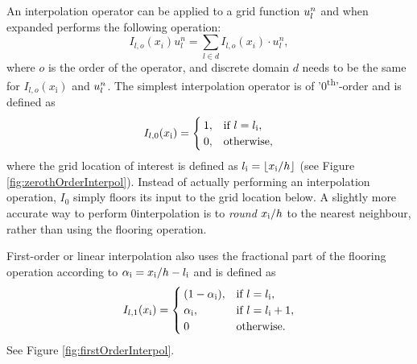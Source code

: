 An interpolation operator can be applied to a grid function $u_l^n$ and when expanded performs the following operation:
\begin{equation}
    I_{l,o}(x_i)u_l^n = \sum_{l\in d} I_{l,o}(x_i)\cdot u_l^n,
\end{equation} 
where $o$ is the order of the operator, and discrete domain $d$ needs to be the same for $I_{l,o}(x_\text{i})$ and $u_l^n$.
The simplest interpolation operator is of '0\textsuperscript{th}'-order and is defined as
\begin{equation}\label{eq:zerothOrderI}
    I_{l,0}(x_{\text{i}}) = \begin{cases}
        1, & \text{if}\ l = l_{\text{i}},\\
        0, & \text{otherwise},
    \end{cases}
\end{equation}
where the grid location of interest is defined as $l_\itxt = \floor[x_\itxt / h]$ (see Figure \ref{fig:zerothOrderInterpol}). Instead of actually performing an interpolation operation, $I_0$ simply floors its input to the grid location below. 
%
% 
%
A slightly more accurate way to perform 0\thOrder interpolation is to \textit{round} $x_{\text{i}}/h$ to the nearest neighbour, rather than using the flooring operation. 

First-order or linear interpolation also uses the fractional part of the flooring operation according to $\alpha_{\text{i}} = x_{\text{i}} / h - l_{\text{i}}$ and is defined as
\begin{equation}\label{eq:firstOrderI}
    I_{l,1}(x_{\text{i}}) = \begin{cases}
        (1-\alpha_{\text{i}}), & \text{if}\ l = l_{\text{i}},\\
        \alpha_{\text{i}} , & \text{if}\ l = l_{\text{i}} + 1,\\
        0 & \text{otherwise.}
    \end{cases}
\end{equation}
See Figure \ref{fig:firstOrderInterpol}. 

